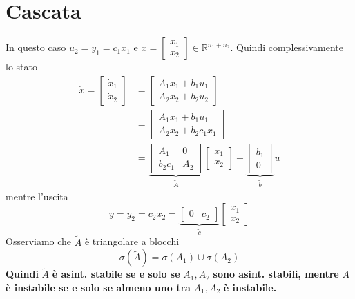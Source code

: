 \documentclass[10pt,a4paper]{book}
\begin{document}
\section{Cascata}

In questo caso $u_{2} =y_{1} =c_{1} x_{1}$ e $x=\begin{bmatrix}
x_{1}\\
x_{2}
\end{bmatrix} \in \mathbb{R}^{n_{1} +n_{2}}$. Quindi complessivamente lo stato
\begin{equation*}
\begin{aligned}
\dot{x} =\begin{bmatrix}
\dot{x}_{1}\\
\dot{x}_{2}
\end{bmatrix} & =\begin{bmatrix}
A_{1} x_{1} +b_{1} u_{1}\\
A_{2} x_{2} +b_{2} u_{2}
\end{bmatrix}\\
 & =\begin{bmatrix}
A_{1} x_{1} +b_{1} u_{1}\\
A_{2} x_{2} +b_{2} c_{1} x_{1}
\end{bmatrix}\\
 & =\underbrace{\begin{bmatrix}
A_{1} & 0\\
b_{2} c_{1} & A_{2}
\end{bmatrix}}_{\tilde{A}}\begin{bmatrix}
x_{1}\\
x_{2}
\end{bmatrix} +\underbrace{\begin{bmatrix}
b_{1}\\
0
\end{bmatrix}}_{\tilde{b}} u
\end{aligned}
\end{equation*}
mentre l'uscita
\begin{equation*}
y=y_{2} =c_{2} x_{2} =\underbrace{\begin{bmatrix}
0 & c_{2}
\end{bmatrix}}_{\tilde{c}}\begin{bmatrix}
x_{1}\\
x_{2}
\end{bmatrix}
\end{equation*}
Osserviamo che $\tilde{A}$ è triangolare a blocchi
\begin{equation*}
\boxed{\sigma \left(\tilde{A}\right) =\sigma \left( A_{1}\right) \cup \sigma \left( A_{2}\right)}
\end{equation*}
\textbf{Quindi }$\tilde{A}$\textbf{ è asint. stabile se e solo se }$A_{1} ,A_{2}$\textbf{ sono asint. stabili, mentre }$\tilde{A}$\textbf{ è instabile se e solo se almeno uno tra }$A_{1} ,A_{2}$\textbf{ è instabile.}
\end{document}
